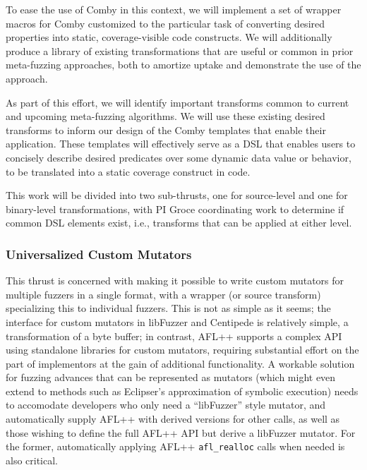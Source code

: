 To ease the use of Comby in this context, we will implement a set of wrapper
macros for Comby customized to the particular task of converting desired
properties into static, coverage-visible code constructs.  We will additionally
produce a library of existing transformations that are useful or common in prior
meta-fuzzing approaches, both to amortize uptake and demonstrate the use of the
approach.  

As part of this effort, we will identify important transforms common to current
and upcoming meta-fuzzing algorithms.  We will use these existing desired
transforms to inform our design of the Comby templates that enable their
application. These templates will effectively serve as a DSL that enables users
to concisely describe desired predicates over some dynamic data value or
behavior, to be translated into a static coverage construct in code. 




This work will be divided into two sub-thrusts, one for source-level and one 
for binary-level transformations, with PI Groce coordinating work to determine 
if common DSL elements exist, i.e., transforms that can be applied at either 
level.


\subsubsection{Universalized Custom Mutators}

This thrust is concerned with making it possible to write custom mutators for 
multiple fuzzers in a single format, with a wrapper (or source transform) 
specializing this to individual fuzzers.  This is not as simple as it
seems; the interface for custom mutators in libFuzzer and Centipede is
relatively simple, a transformation of a byte buffer; in contrast,
AFL++ supports a complex API using standalone libraries for custom
mutators, requiring substantial effort on the part of implementors at
the gain of additional functionality.  A workable solution for fuzzing
advances that can be represented as mutators (which might even extend
to methods such as Eclipser's approximation of symbolic execution)
needs to accomodate developers who only need a ``libFuzzer'' style
mutator, and automatically supply AFL++ with derived versions for
other calls, as well as those wishing to define the full AFL++ API but
derive a libFuzzer mutator. For the former, automatically applying
AFL++ {\tt afl\_realloc} calls when needed is also critical.

